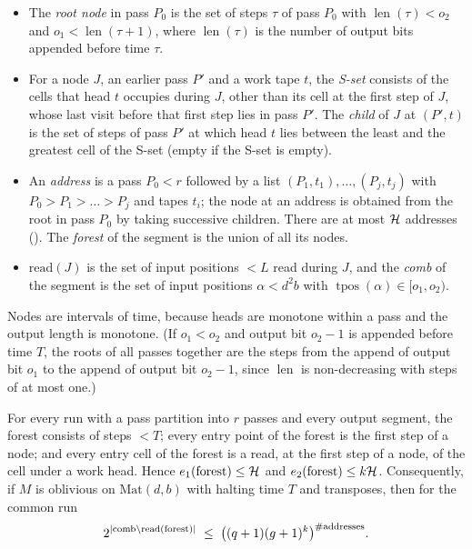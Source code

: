 \begin{definition}\label{def:forest}
\begin{itemize}[leftmargin=2em]
\item The \emph{root node} in pass $P_0$ is the set of steps $\tau$ of pass $P_0$ with $\operatorname{len}(\tau)<o_2$ and $o_1<\operatorname{len}(\tau+1)$, where $\operatorname{len}(\tau)$ is the number of output bits appended before time $\tau$.
\item For a node $J$, an earlier pass $P'$ and a work tape $t$, the \emph{S-set} consists of the
cells that head $t$ occupies during $J$, other than its cell at the first step of $J$, whose last
visit before that first step lies in pass $P'$. The \emph{child} of $J$ at $(P',t)$ is the set of
steps of pass $P'$ at which head $t$ lies between the least and the greatest cell of the S-set
(empty if the S-set is empty).
\item An \emph{address} is a pass $P_0<r$ followed by a list $(P_1,t_1),\dots,(P_j,t_j)$ with
$P_0>P_1>\dots>P_j$ and tapes $t_i$; the node at an address is obtained from the root in pass
$P_0$ by taking successive children. There are at most $\mathcal{H}$ addresses
(). The \emph{forest} of the segment is the union of all its nodes.
\item $\mathrm{read}(J)$ is the set of input positions $<L$ read during $J$, and the \emph{comb}
of the segment is the set of input positions $\alpha<d^2b$ with $\operatorname{tpos}(\alpha)\in[o_1,o_2)$.
\end{itemize}
\end{definition}

Nodes are intervals of time, because heads are monotone within a pass and the output length is monotone. (If $o_1<o_2$ and output bit $o_2-1$ is appended before time $T$, the roots of all passes together are the steps from the append of output bit $o_1$ to the append of output bit $o_2-1$, since $\operatorname{len}$ is non-decreasing with steps of at most one.)

\begin{lemma}[Forest]\label{lem:forest}
For every run with a pass partition into $r$ passes and every output segment, the forest consists
of steps $<T$; every entry point of the forest is the first step of a node; and every entry cell
of the forest is a read, at the first step of a node, of the cell under a work head. Hence
$e_1(\mathrm{forest})\le\mathcal{H}$ and $e_2(\mathrm{forest})\le k\mathcal{H}$. Consequently, if $M$ is
oblivious on $\mathrm{Mat}(d,b)$ with halting time $T$ and transposes, then for the common run
\[
  2^{\lvert \mathrm{comb}\setminus\mathrm{read}(\mathrm{forest}) \rvert}\;\le\;
  \bigl((q+1)(g+1)^k\bigr)^{\#\mathrm{addresses}} .
\]
\end{lemma}

